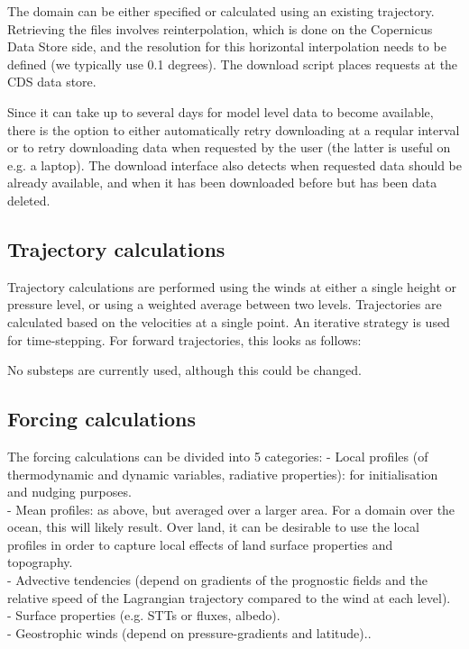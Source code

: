 \documentclass[a4paper,11pt]{article}
\begin{document}
The domain can be either specified or calculated using an existing
trajectory. Retrieving the files involves reinterpolation, which is
done on the Copernicus Data Store side, and the resolution for this
horizontal interpolation needs to be defined (we typically use 0.1
degrees). The download script places requests at the CDS data store.

Since it can take up to several days for model level data to become
available, there is the option to either automatically retry
downloading at a reqular interval or to retry downloading data when
requested by the user (the latter is useful on e.g. a laptop).
The download interface also detects when requested data should be
already available, and when it has been downloaded before but has been
data deleted.

\subsection{Trajectory calculations}

Trajectory calculations are performed using the winds at either a single
height or pressure level, or using a weighted average between two levels.
Trajectories are calculated based on the velocities at a single point.
An iterative strategy \citep{petterssen1956,sprenger2015} is used for time-stepping.
For forward trajectories, this looks as follows:

No substeps are currently used, although this could be changed.


\subsection{Forcing calculations}

The forcing calculations can be divided into 5 categories:
- Local profiles (of thermodynamic and dynamic variables, radiative
properties): for initialisation and nudging purposes. \\
- Mean profiles: as above, but averaged over a larger area. For a
domain over the ocean, this will likely result. Over land, it can be
desirable to use the local profiles in order to capture local effects
of land surface properties and topography. \\
- Advective tendencies (depend on gradients of the prognostic fields
and the relative speed of the Lagrangian trajectory compared to the wind
at each level). \\
- Surface properties (e.g. STTs or fluxes, albedo). \\
- Geostrophic winds (depend on pressure-gradients and latitude).. \\
\end{document}
